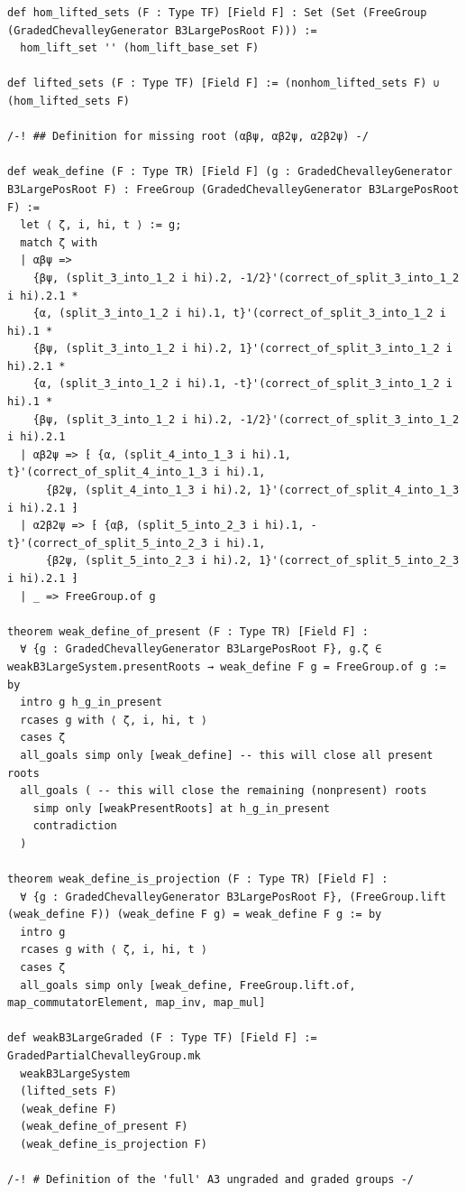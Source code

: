 \begin{Verbatim}
def hom_lifted_sets (F : Type TF) [Field F] : Set (Set (FreeGroup (GradedChevalleyGenerator B3LargePosRoot F))) :=
  hom_lift_set '' (hom_lift_base_set F)

def lifted_sets (F : Type TF) [Field F] := (nonhom_lifted_sets F) ∪ (hom_lifted_sets F)

/-! ## Definition for missing root (αβψ, αβ2ψ, α2β2ψ) -/

def weak_define (F : Type TR) [Field F] (g : GradedChevalleyGenerator B3LargePosRoot F) : FreeGroup (GradedChevalleyGenerator B3LargePosRoot F) :=
  let ⟨ ζ, i, hi, t ⟩ := g;
  match ζ with
  | αβψ =>
    {βψ, (split_3_into_1_2 i hi).2, -1/2}'(correct_of_split_3_into_1_2 i hi).2.1 *
    {α, (split_3_into_1_2 i hi).1, t}'(correct_of_split_3_into_1_2 i hi).1 *
    {βψ, (split_3_into_1_2 i hi).2, 1}'(correct_of_split_3_into_1_2 i hi).2.1 *
    {α, (split_3_into_1_2 i hi).1, -t}'(correct_of_split_3_into_1_2 i hi).1 *
    {βψ, (split_3_into_1_2 i hi).2, -1/2}'(correct_of_split_3_into_1_2 i hi).2.1
  | αβ2ψ => ⁅ {α, (split_4_into_1_3 i hi).1, t}'(correct_of_split_4_into_1_3 i hi).1,
      {β2ψ, (split_4_into_1_3 i hi).2, 1}'(correct_of_split_4_into_1_3 i hi).2.1 ⁆
  | α2β2ψ => ⁅ {αβ, (split_5_into_2_3 i hi).1, -t}'(correct_of_split_5_into_2_3 i hi).1,
      {β2ψ, (split_5_into_2_3 i hi).2, 1}'(correct_of_split_5_into_2_3 i hi).2.1 ⁆
  | _ => FreeGroup.of g

theorem weak_define_of_present (F : Type TR) [Field F] :
  ∀ {g : GradedChevalleyGenerator B3LargePosRoot F}, g.ζ ∈ weakB3LargeSystem.presentRoots → weak_define F g = FreeGroup.of g := by
  intro g h_g_in_present
  rcases g with ⟨ ζ, i, hi, t ⟩
  cases ζ
  all_goals simp only [weak_define] -- this will close all present roots
  all_goals ( -- this will close the remaining (nonpresent) roots
    simp only [weakPresentRoots] at h_g_in_present
    contradiction
  )

theorem weak_define_is_projection (F : Type TR) [Field F] :
  ∀ {g : GradedChevalleyGenerator B3LargePosRoot F}, (FreeGroup.lift (weak_define F)) (weak_define F g) = weak_define F g := by
  intro g
  rcases g with ⟨ ζ, i, hi, t ⟩
  cases ζ
  all_goals simp only [weak_define, FreeGroup.lift.of, map_commutatorElement, map_inv, map_mul]

def weakB3LargeGraded (F : Type TF) [Field F] := GradedPartialChevalleyGroup.mk
  weakB3LargeSystem
  (lifted_sets F)
  (weak_define F)
  (weak_define_of_present F)
  (weak_define_is_projection F)

/-! # Definition of the 'full' A3 ungraded and graded groups -/


\end{Verbatim}
